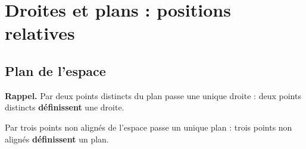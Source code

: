 \section{Droites et plans : positions relatives}

\subsection{Plan de l'espace}

\textbf{Rappel.} Par deux points distincts du plan passe une unique droite : deux points distincts \textbf{définissent} une droite.

\begin{prop}
	Par trois points non alignés de l'espace passe un unique plan : trois points non alignés \textbf{définissent} un plan.
\end{prop}

